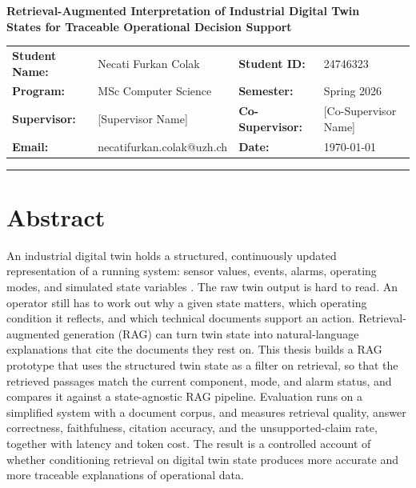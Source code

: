 \documentclass[10pt,a4paper]{article}
\begin{document}
\begin{center}
    {\Large \textbf{Retrieval-Augmented Interpretation of Industrial Digital Twin\\[0.15em]States for Traceable Operational Decision Support}}
\end{center}

\vspace{0.35em}

\noindent
\begin{tabularx}{\textwidth}{>{\bfseries}l X >{\bfseries}l X}
Student Name: & Necati Furkan Colak       & Student ID:     & 24746323 \\
Program:      & MSc Computer Science      & Semester:       & Spring 2026 \\
Supervisor:   & [Supervisor Name]         & Co-Supervisor:  & [Co-Supervisor Name] \\
Email:        & necatifurkan.colak@uzh.ch & Date:           & \today \\
\end{tabularx}

\vspace{0.5em}
\hrule
\vspace{0.5em}

\section{Abstract}

An industrial digital twin holds a structured, continuously updated representation of a running system: sensor values, events, alarms, operating modes, and simulated state variables \cite{grieves2017}. The raw twin output is hard to read. An operator still has to work out why a given state matters, which operating condition it reflects, and which technical documents support an action. Retrieval-augmented generation (RAG) \cite{lewis2020rag} can turn twin state into natural-language explanations that cite the documents they rest on. This thesis builds a RAG prototype that uses the structured twin state as a filter on retrieval, so that the retrieved passages match the current component, mode, and alarm status, and compares it against a state-agnostic RAG pipeline. Evaluation runs on a simplified system with a document corpus, and measures retrieval quality, answer correctness, faithfulness, citation accuracy, and the unsupported-claim rate, together with latency and token cost. The result is a controlled account of whether conditioning retrieval on digital twin state produces more accurate and more traceable explanations of operational data.
\end{document}

